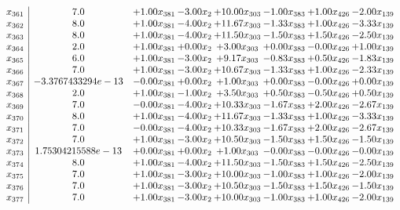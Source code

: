 \documentclass[8pt]{article}
\begin{document}
\[\begin{array}{c| c c@{\hskip 2pt} c@{\hskip 2pt} c@{\hskip 2pt} c@{\hskip 2pt} c@{\hskip 2pt} c@{\hskip 2pt} }
 x_{361}   &  7.0 & +  1.00 x_{381} & -3.00 x_{2} & + 10.00 x_{303} & -1.00 x_{383} & +  1.00 x_{426} & -2.00 x_{139}\\
 x_{362}   &  8.0 & +  1.00 x_{381} & -4.00 x_{2} & + 11.67 x_{303} & -1.33 x_{383} & +  1.00 x_{426} & -3.33 x_{139}\\
 x_{363}   &  8.0 & +  1.00 x_{381} & -4.00 x_{2} & + 11.50 x_{303} & -1.50 x_{383} & +  1.50 x_{426} & -2.50 x_{139}\\
 x_{364}   &  2.0 & +  1.00 x_{381} & +  0.00 x_{2} & +  3.00 x_{303} & +  0.00 x_{383} & -0.00 x_{426} & +  1.00 x_{139}\\
 x_{365}   &  6.0 & +  1.00 x_{381} & -3.00 x_{2} & +  9.17 x_{303} & -0.83 x_{383} & +  0.50 x_{426} & -1.83 x_{139}\\
 x_{366}   &  7.0 & +  1.00 x_{381} & -3.00 x_{2} & + 10.67 x_{303} & -1.33 x_{383} & +  1.00 x_{426} & -2.33 x_{139}\\
 x_{367}   &  -3.3767433294e-13 & -0.00 x_{381} & +  0.00 x_{2} & +  1.00 x_{303} & +  0.00 x_{383} & -0.00 x_{426} & +  0.00 x_{139}\\
 x_{368}   &  2.0 & +  1.00 x_{381} & -1.00 x_{2} & +  3.50 x_{303} & +  0.50 x_{383} & -0.50 x_{426} & +  0.50 x_{139}\\
 x_{369}   &  7.0 & -0.00 x_{381} & -4.00 x_{2} & + 10.33 x_{303} & -1.67 x_{383} & +  2.00 x_{426} & -2.67 x_{139}\\
 x_{370}   &  8.0 & +  1.00 x_{381} & -4.00 x_{2} & + 11.67 x_{303} & -1.33 x_{383} & +  1.00 x_{426} & -3.33 x_{139}\\
 x_{371}   &  7.0 & -0.00 x_{381} & -4.00 x_{2} & + 10.33 x_{303} & -1.67 x_{383} & +  2.00 x_{426} & -2.67 x_{139}\\
 x_{372}   &  7.0 & +  1.00 x_{381} & -3.00 x_{2} & + 10.50 x_{303} & -1.50 x_{383} & +  1.50 x_{426} & -1.50 x_{139}\\
 x_{373}   &  1.75304215588e-13 & +  0.00 x_{381} & +  0.00 x_{2} & +  1.00 x_{303} & -0.00 x_{383} & -0.00 x_{426} & -0.00 x_{139}\\
 x_{374}   &  8.0 & +  1.00 x_{381} & -4.00 x_{2} & + 11.50 x_{303} & -1.50 x_{383} & +  1.50 x_{426} & -2.50 x_{139}\\
 x_{375}   &  7.0 & +  1.00 x_{381} & -3.00 x_{2} & + 10.00 x_{303} & -1.00 x_{383} & +  1.00 x_{426} & -2.00 x_{139}\\
 x_{376}   &  7.0 & +  1.00 x_{381} & -3.00 x_{2} & + 10.50 x_{303} & -1.50 x_{383} & +  1.50 x_{426} & -1.50 x_{139}\\
 x_{377}   &  7.0 & +  1.00 x_{381} & -3.00 x_{2} & + 10.00 x_{303} & -1.00 x_{383} & +  1.00 x_{426} & -2.00 x_{139}\\

\end{array}\]
\end{document}
